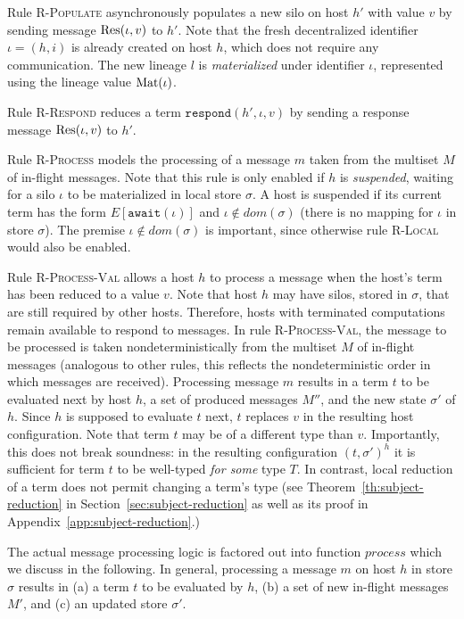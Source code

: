 Rule \textsc{R-Populate} asynchronously populates a new silo on host
$h'$ with value $v$ by sending message ${\textrm{Res}(\iota, v)}$ to $h'$. Note
that the fresh decentralized identifier $\iota = (h, i)$ is already
created on host $h$, which does not require any communication. The new
lineage $l$ is {\em materialized} under identifier $\iota$,
represented using the lineage value ${\textrm{Mat}(\iota)}$.

Rule \textsc{R-Respond} reduces a term $\texttt{respond}(h', \iota,
v)$ by sending a response message ${\textrm{Res}(\iota, v)}$ to $h'$.

Rule \textsc{R-Process} models the processing of a message $m$ taken
from the multiset $M$ of in-flight messages. Note that this rule is
only enabled if $h$ is {\it suspended}, waiting for a silo $\iota$ to
be materialized in local store $\sigma$. A host is suspended if its
current term has the form $E[\texttt{await}(\iota)]$ and $\iota \notin
\mathit{dom}(\sigma)$ (there is no mapping for $\iota$ in store
$\sigma$). The premise $\iota \notin \mathit{dom}(\sigma)$ is
important, since otherwise rule \textsc{R-Local} would also be
enabled.

Rule \textsc{R-Process-Val} allows a host $h$ to process a message
when the host's term has been reduced to a value $v$. Note that host
$h$ may have silos, stored in $\sigma$, that are still required by
other hosts. Therefore, hosts with terminated computations remain
available to respond to messages. In rule \textsc{R-Process-Val}, the
message to be processed is taken nondeterministically from the
multiset $M$ of in-flight messages (analogous to other rules, this
reflects the nondeterministic order in which messages are received).
Processing message $m$ results in a term $t$ to be evaluated next by
host $h$, a set of produced messages $M''$, and the new state
$\sigma'$ of $h$. Since $h$ is supposed to evaluate $t$ next, $t$
replaces $v$ in the resulting host configuration. Note that term $t$
may be of a different type than $v$. Importantly, this does not break
soundness: in the resulting configuration $(t, \sigma')^h$ it is
sufficient for term $t$ to be well-typed {\it for some} type $T$. In
contrast, local reduction of a term does not permit changing a term's
type (see Theorem~\ref{th:subject-reduction} in
Section~\ref{sec:subject-reduction} as well as its proof in
Appendix~\ref{app:subject-reduction}.)

The actual message processing logic is factored out into function
$\mathit{process}$ which we discuss in the following. In general,
processing a message $m$ on host $h$ in store $\sigma$ results in (a)
a term $t$ to be evaluated by $h$, (b) a set of new in-flight messages
$M'$, and (c) an updated store $\sigma'$.



